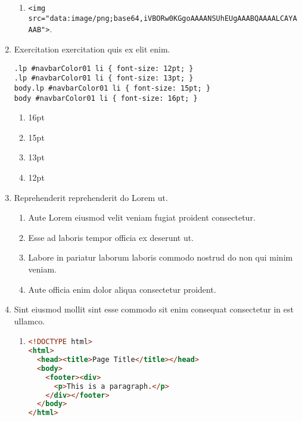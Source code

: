 \documentclass[a4paper,12pt]{article}
\begin{document}
\begin{enumerate}[label=\textbf{\arabic*.}]
\begin{enumerate}
		\item  \texttt{<img src="{}data:image/png;base64,iVBORw0KGgoAAAANSUhEUgAAABQAAAALCAYAAAB"{}>}.
    
	\end{enumerate}

\item Exercitation exercitation quis ex elit enim.
  
  \begin{minipage}{\textwidth} %
  \begin{lstlisting}
.lp #navbarColor01 li { font-size: 12pt; }
.lp #navbarColor01 li { font-size: 13pt; }
body.lp #navbarColor01 li { font-size: 15pt; }
body #navbarColor01 li { font-size: 16pt; }
  \end{lstlisting}
  \end{minipage}
\begin{multicols}{2}
	\begin{enumerate}
		\item  16pt
  
		\item  15pt
    
		\item  13pt
    
		\item  12pt
    
	\end{enumerate}

\end{multicols}
\item Reprehenderit reprehenderit do Lorem ut.
\begin{multicols}{2}
	\begin{enumerate}
		\item  Aute Lorem eiusmod velit veniam fugiat proident consectetur.
  
		\item  Esse ad laboris tempor officia ex deserunt ut.
    
		\item  Labore in pariatur laborum laboris commodo nostrud do non qui minim veniam.
    
		\item  Aute officia enim dolor aliqua consectetur proident.
    
	\end{enumerate}

\end{multicols}
\item Sint eiusmod mollit sint esse commodo sit enim consequat consectetur in est ullamco.
	\begin{enumerate}
		\item  \hfill \vspace*{-7mm}
    \begin{lstlisting}[language=HTML]
<!DOCTYPE html>
<html>
  <head><title>Page Title</title></head>
  <body>
    <footer><div>
      <p>This is a paragraph.</p>
    </div></footer>
  </body>
</html>
    \end{lstlisting}
  

\end{enumerate}
\end{enumerate}
\end{document}
